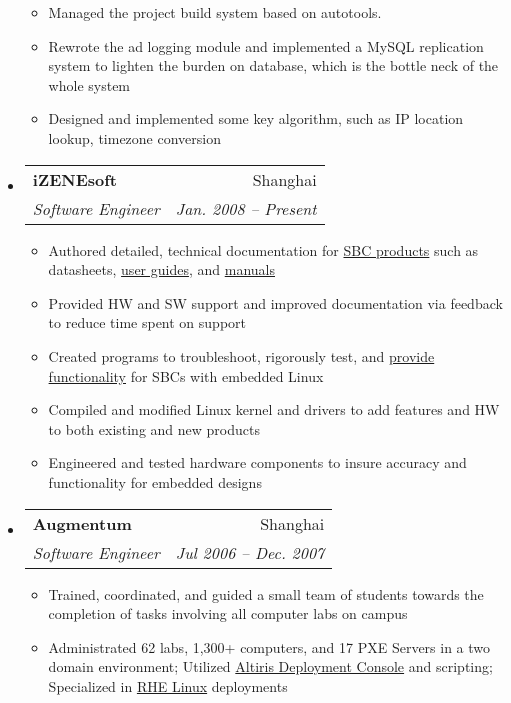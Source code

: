 \documentclass[letterpaper,11pt]{article}
\makeatletter
\newcommand{\resitem}[1]{\item #1 \vspace{-2pt}}
\newcommand{\ressubheading}[4]{
\begin{tabular*}{6.5in}{l@{\extracolsep{\fill}}r}
		\textbf{#1} & #2 \\
		\textit{#3} & \textit{#4} \\
\end{tabular*}\vspace{-6pt}}
\makeatother
\begin{document}
\begin{itemize}
{\begin{itemize}
      \resitem{Managed the project build system based on autotools.}

      \resitem{Rewrote the ad logging module and implemented a MySQL replication
        system to lighten the burden on database, which is the bottle neck of
        the whole system}
      
      \resitem{Designed and implemented some key algorithm, such as IP location
        lookup, timezone conversion}

    \end{itemize}
  }

\item \ressubheading{iZENEsoft}{Shanghai}{Software Engineer}{Jan. 2008 -- Present}
  { \footnotesize
    \begin{itemize}
      \resitem{Authored detailed, technical documentation for \href{http://www.embeddedarm.com/products/index.php}{SBC products} such as datasheets,  \href{http://www.embeddedarm.com/about/resource.php?item=410}{user guides}, and \href{http://www.embeddedarm.com/about/resource.php?item=409}{manuals}}

      \resitem{Provided HW and SW support and improved documentation via feedback to reduce time spent on support}
	
      \resitem{Created programs to troubleshoot, rigorously test, and \href{ftp://ftp.embeddedarm.com/ts-arm-sbc/ts-7500-linux/samples/sbus.c}{provide functionality} for SBCs with embedded Linux}
	
      \resitem{Compiled and modified Linux kernel and drivers to add features and HW to both existing and new products}
	
      \resitem{Engineered and tested hardware components to insure accuracy and functionality for embedded designs}
    \end{itemize}
  }

\item \ressubheading{Augmentum}{Shanghai}{Software Engineer}{Jul 2006 -- Dec. 2007}
  { \footnotesize
    \begin{itemize}
      \resitem{Trained, coordinated, and guided a small team of students towards the completion of tasks involving all computer labs on campus}

      \resitem{Administrated 62 labs, 1,300+ computers, and 17 PXE Servers in a two domain environment;  Utilized \href{http://www.symantec.com/business/deployment-solution}{Altiris Deployment Console} and scripting;  Specialized in \href{http://www.redhat.com/rhel/}{RHE Linux} deployments}


\end{itemize}}
\end{itemize}
\end{document}
